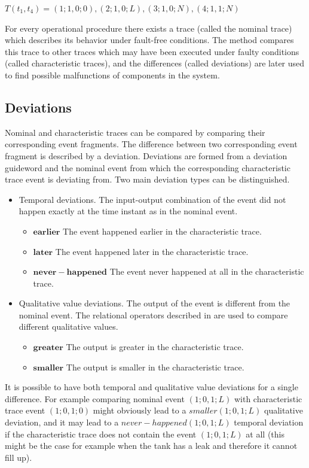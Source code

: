 \documentclass[conference]{IEEEtran}
\begin{document}
$T(t_1,t_4)=(1;1,0;0),(2;1,0;L),(3;1,0;N),(4;1,1;N)$

For every operational procedure there exists a trace (called the nominal trace) which describes its behavior under fault-free conditions. The method compares this trace to other traces which may have been executed under faulty conditions (called characteristic traces), and the differences (called deviations) are later used to find possible malfunctions of components in the system.

\subsection{Deviations}
\label{sec:deviations}
Nominal and characteristic traces can be compared by comparing their corresponding event fragments. The difference between two corresponding event fragment is described by a deviation. Deviations are formed from a deviation guideword and the nominal event from which the corresponding characteristic trace event is deviating from. Two main deviation types can be distinguished.

\begin{itemize}
\item Temporal deviations. The input-output combination of the event did not happen exactly at the time instant as in the nominal event. 
	\begin{itemize}
	  \item $\mathbf{earlier}$ The event happened earlier in the characteristic trace.
	  \item $\mathbf{later}$ The event happened later in the characteristic trace.
	  \item $\mathbf{never-happened}$ The event never happened at all in the characteristic trace.
	\end{itemize}
\item Qualitative value deviations. The output of the event is different from the nominal event. The relational operators described in \cite{KES2010} are used to compare different qualitative values.
	\begin{itemize}
	  \item $\mathbf{greater}$ The output is greater in the characteristic trace.
	  \item $\mathbf{smaller}$ The output is smaller in the characteristic trace.
	\end{itemize}
\end{itemize}

It is possible to have both temporal and qualitative value deviations for a single difference. For example comparing nominal event $(1;0,1;L)$ with characteristic trace event $(1;0,1;0)$ might obviously lead to a $smaller(1;0,1;L)$ qualitative deviation, and it may lead to a $never-happened(1;0,1;L)$ temporal deviation if the characteristic trace does not contain the event $(1;0,1;L)$ at all (this might be the case for example when the tank has a leak and therefore it cannot fill up).
\end{document}
